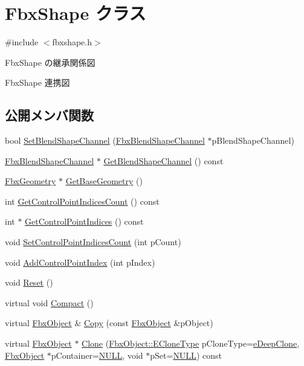 \hypertarget{class_fbx_shape}{}\section{Fbx\+Shape クラス}
\label{class_fbx_shape}


{\ttfamily \#include $<$fbxshape.\+h$>$}



Fbx\+Shape の継承関係図


Fbx\+Shape 連携図
\subsection*{公開メンバ関数}
\begin{DoxyCompactItemize}
\item 
bool \hyperlink{class_fbx_shape_ae3e784d16a332f9c874f745846a2980e}{Set\+Blend\+Shape\+Channel} (\hyperlink{class_fbx_blend_shape_channel}{Fbx\+Blend\+Shape\+Channel} $\ast$p\+Blend\+Shape\+Channel)
\item 
\hyperlink{class_fbx_blend_shape_channel}{Fbx\+Blend\+Shape\+Channel} $\ast$ \hyperlink{class_fbx_shape_a311a362cbfde68630794a7fb20cff9ee}{Get\+Blend\+Shape\+Channel} () const
\item 
\hyperlink{class_fbx_geometry}{Fbx\+Geometry} $\ast$ \hyperlink{class_fbx_shape_ad011e68be3532c1e16c9871f7b31d8b4}{Get\+Base\+Geometry} ()
\item 
int \hyperlink{class_fbx_shape_afd2216f7ace9be5b39f2d5d6dcc8447f}{Get\+Control\+Point\+Indices\+Count} () const
\item 
int $\ast$ \hyperlink{class_fbx_shape_ad32f3e5fef82478e0f5c5bdf499b8f28}{Get\+Control\+Point\+Indices} () const
\item 
void \hyperlink{class_fbx_shape_a6c62c9590c9634305a65f50916eaded3}{Set\+Control\+Point\+Indices\+Count} (int p\+Count)
\item 
void \hyperlink{class_fbx_shape_ac64fb6d8fc185a698a7c982805538e47}{Add\+Control\+Point\+Index} (int p\+Index)
\item 
void \hyperlink{class_fbx_shape_afe25ad1148c4165f9821cc7bc7b50c94}{Reset} ()
\item 
virtual void \hyperlink{class_fbx_shape_a9c3c948d3646bf78472164860ad11d65}{Compact} ()
\item 
virtual \hyperlink{class_fbx_object}{Fbx\+Object} \& \hyperlink{class_fbx_shape_ab9776a1c0ce41830bc6841ebba4c4a23}{Copy} (const \hyperlink{class_fbx_object}{Fbx\+Object} \&p\+Object)
\item 
virtual \hyperlink{class_fbx_object}{Fbx\+Object} $\ast$ \hyperlink{class_fbx_shape_aca0dfb34dc9b38d5fdbf0d004fc60697}{Clone} (\hyperlink{class_fbx_object_a9f5626b2d2135684d6ea1e6e4ad2acbb}{Fbx\+Object\+::\+E\+Clone\+Type} p\+Clone\+Type=\hyperlink{class_fbx_object_a9f5626b2d2135684d6ea1e6e4ad2acbbaacdf137ca059c572798287e98c4236d0}{e\+Deep\+Clone}, \hyperlink{class_fbx_object}{Fbx\+Object} $\ast$p\+Container=\hyperlink{fbxarch_8h_a070d2ce7b6bb7e5c05602aa8c308d0c4}{N\+U\+LL}, void $\ast$p\+Set=\hyperlink{fbxarch_8h_a070d2ce7b6bb7e5c05602aa8c308d0c4}{N\+U\+LL}) const
\end{DoxyCompactItemize}
